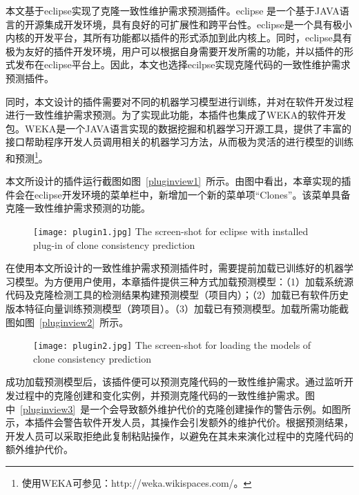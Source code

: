 本文基于eclipse实现了克隆一致性维护需求预测插件。eclipse 是一个基于JAVA语言的开源集成开发环境，具有良好的可扩展性和跨平台性。eclipse是一个具有极小内核的开发平台，其所有功能都以插件的形式添加到此内核上。同时，eclipse具有极为友好的插件开发环境，用户可以根据自身需要开发所需的功能，并以插件的形式发布在eclipse平台上。因此，本文也选择ecilpse实现克隆代码的一致性维护需求预测插件。

同时，本文设计的插件需要对不同的机器学习模型进行训练，并对在软件开发过程进行一致性维护需求预测。为了实现此功能，本插件也集成了WEKA的软件开发包。WEKA是一个JAVA语言实现的数据挖掘和机器学习开源工具，提供了丰富的接口帮助程序开发人员调用相关的机器学习方法，从而极为灵活的进行模型的训练和预测\footnote{使用WEKA可参见：http://weka.wikispaces.com/。}。

本文所设计的插件运行截图如图~\ref{pluginview1}~所示。由图中看出，本章实现的插件会在eclipse开发环境的菜单栏中，新增加一个新的菜单项“Clones”。该菜单具备克隆一致性维护需求预测的功能。

\begin{figure}[htbp]
\centering
\texttt{[image: plugin1.jpg]}
{The screen-shot for eclipse with installed plug-in of clone consistency prediction}
\vspace{-1em}
\end{figure}

在使用本文所设计的一致性维护需求预测插件时，需要提前加载已训练好的机器学习模型。为方便用户使用，本章插件提供三种方式加载预测模型：（1）加载系统源代码及克隆检测工具的检测结果构建预测模型（项目内）；（2）加载已有软件历史版本特征向量训练预测模型（跨项目）。（3）加载已有预测模型。加载所需功能截图如图~\ref{pluginview2}~所示。%

\begin{figure}[htbp]
\centering
\texttt{[image: plugin2.jpg]}
{The screen-shot for loading the models of clone consistency prediction}
\vspace{-1em}
\end{figure}

成功加载预测模型后，该插件便可以预测克隆代码的一致性维护需求。通过监听开发过程中的克隆创建和变化实例，并预测克隆代码的一致性维护需求。图中~\ref{pluginview3}~是一个会导致额外维护代价的克隆创建操作的警告示例。如图所示，本插件会警告软件开发人员，其操作会引发额外的维护代价。根据预测结果，开发人员可以采取拒绝此复制粘贴操作，以避免在其未来演化过程中的克隆代码的额外维护代价。

